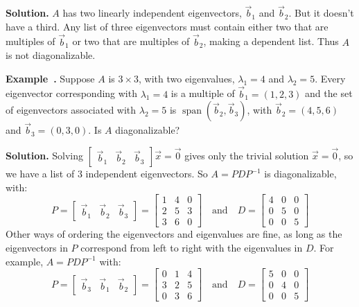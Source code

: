 \documentclass[11pt, letterpaper]{report}
\newenvironment{notes}{}{}
\newenvironment{book}{}{}
\newcounter{example}[section]
\newcommand{\example}{\refstepcounter{example}%
\par\noindent\textbf{Example~\theexample.} }
\DeclareMathOperator{\spn}{span}
\begin{document}
\begin{notes}
\vfill
\end{notes}

\begin{book}
\textbf{Solution.} $A$ has two linearly independent eigenvectors, $\vec{b}_1$ and $\vec{b}_2$. But it doesn't have a third. Any list of three eigenvectors must contain either two that are multiples of $\vec{b}_1$  or two that are multiples of $\vec{b}_2$, making a dependent list. Thus $A$ is not diagonalizable. \blacksquare
\end{book}

\example Suppose $A$ is $3\times3$, with two eigenvalues, $\lambda_1=4$ and $\lambda_2=5$. Every eigenvector corresponding with $\lambda_1 = 4$ is a multiple of $\vec{b}_1=(1,2,3)$ and the set of eigenvectors associated with $\lambda_2=5$ is $\spn ( \vec{b}_2, \vec{b}_3 )$, with $\vec{b}_2=(4,5,6)$ and $\vec{b}_3=(0,3,0)$. Is $A$ diagonalizable?   

\begin{notes}
\vfill
\end{notes}

\begin{book}
\textbf{Solution.} Solving $\begin{bmatrix}
\vec{b}_1 & \vec{b}_2 & \vec{b}_3
\end{bmatrix}\vec{x}=\vec{0}$ gives only the trivial solution $\vec{x}=\vec{0}$, so we have a list of $3$ independent eigenvectors. So $A = PDP^{-1}$ is diagonalizable, with:
\[P=\begin{bmatrix}
\vec{b}_1 & \vec{b}_2 & \vec{b}_3
\end{bmatrix} = \begin{bmatrix}
1 & 4 & 0 \\
2 & 5 & 3 \\
3 & 6 & 0
\end{bmatrix} \quad \text{and}\quad D=\begin{bmatrix}
4 & 0 & 0 \\
0 & 5 & 0 \\
0 & 0 & 5
\end{bmatrix} \]
Other ways of ordering the eigenvectors and eigenvalues are fine, as long as the eigenvectors in $P$ correspond from left to right with the eigenvalues in $D$. For example, $A=PDP^{-1}$ with:
\[P=\begin{bmatrix}
\vec{b}_3 & \vec{b}_1 & \vec{b}_2
\end{bmatrix} = \begin{bmatrix}
0 & 1 & 4 \\
3 & 2 & 5 \\
0 & 3 & 6
\end{bmatrix} \quad \text{and}\quad D=\begin{bmatrix}
5 & 0 & 0 \\
0 & 4 & 0 \\
0 & 0 & 5
\end{bmatrix} \]
\blacksquare
\end{book}
\end{document}
